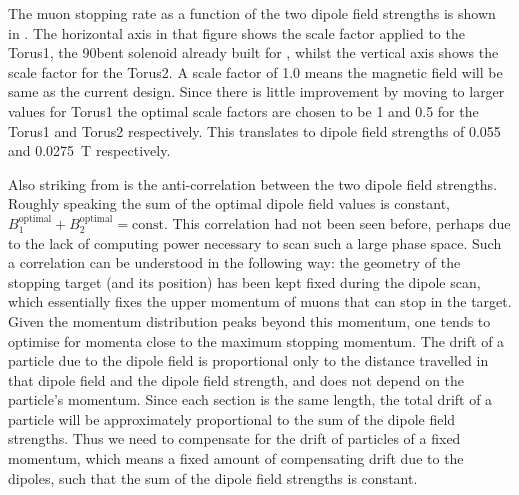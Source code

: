 \FigOptimMuBeamDipolePiStops

The muon stopping rate as a function of the two dipole field strengths is shown in .
The horizontal axis in that figure shows the scale factor applied to the Torus1, the 90\degree bent solenoid already built for \phaseI, whilst the vertical axis shows the scale factor for the Torus2.
A scale factor of 1.0 means the magnetic field will be same as the current \phaseI design.
Since there is little improvement by moving to larger values for Torus1 the optimal scale factors are chosen to be 1 and 0.5 for the Torus1 and Torus2 respectively.  
This translates to dipole field strengths of 0.055 and 0.0275~T respectively.

Also striking from  is the anti-correlation between the two dipole field strengths.  
Roughly speaking the sum of the optimal dipole field values is constant, \ie $B_1^\text{optimal} + B_2^\text{optimal} = \text{const}$.
This correlation had not been seen before, perhaps due to the lack of computing power necessary to scan such a large phase space.
Such a correlation can be understood in the following way:
the geometry of the stopping target (and its position) has been kept fixed during the dipole scan, which
essentially fixes the upper momentum of muons that can stop in the target.
Given the momentum distribution peaks beyond this momentum, one tends to optimise for momenta close to the maximum stopping momentum.
The drift of a particle due to the dipole field is proportional only to the distance travelled in that dipole field and the dipole field strength, and does not depend on the particle's momentum.
Since each section is the same length, the total drift of a particle will be approximately proportional to the sum of the dipole field strengths.
Thus we need to compensate for the drift of particles of a fixed momentum, which means a fixed amount of compensating drift due to the dipoles, such that the sum of the dipole field strengths is constant.
